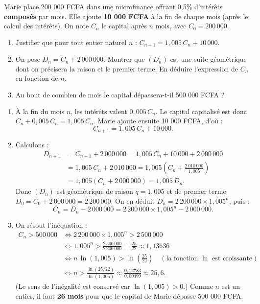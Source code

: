 \documentclass[11pt]{article}
\begin{document}
\begin{exercice}
Marie place 200 000 FCFA dans une microfinance offrant 0,5\% d'intérêts \textbf{composés} par mois. Elle ajoute \textbf{10 000 FCFA} à la fin de chaque mois (après le calcul des intérêts). On note $C_n$ le capital après $n$ mois, avec $C_0 = 200\,000$.
\begin{enumerate}
    \item Justifier que pour tout entier naturel $n$ : $C_{n+1} = 1,005\, C_n + 10\,000$.
    \item On pose $D_n = C_n + 2\,000\,000$. Montrer que $(D_n)$ est une suite géométrique dont on précisera la raison et le premier terme. En déduire l'expression de $C_n$ en fonction de $n$.
    \item Au bout de combien de mois le capital dépassera-t-il 500 000 FCFA ?
\end{enumerate}
\end{exercice}

\begin{corrige}[Exercice 1]
\begin{enumerate}
    \item À la fin du mois $n$, les intérêts valent $0,005\, C_n$. Le capital capitalisé est donc $C_n + 0,005\,C_n = 1,005\,C_n$. Marie ajoute ensuite 10 000 FCFA, d'où :
    \[
    C_{n+1} = 1,005\, C_n + 10\,000.
    \]
    \item Calculons :
    \begin{align*}
    D_{n+1} &= C_{n+1} + 2\,000\,000 = 1,005\, C_n + 10\,000 + 2\,000\,000 \\
    &= 1,005\, C_n + 2\,010\,000 = 1,005\left(C_n + \frac{2\,010\,000}{1,005}\right) \\
    &= 1,005\left(C_n + 2\,000\,000\right) = 1,005\, D_n.
    \end{align*}
    Donc $(D_n)$ est géométrique de raison $q = 1,005$ et de premier terme $D_0 = C_0 + 2\,000\,000 = 2\,200\,000$.
    On en déduit $D_n = 2\,200\,000 \times 1,005^n$, puis :
    \[
    C_n = D_n - 2\,000\,000 = 2\,200\,000 \times 1,005^n - 2\,000\,000.
    \]
    \item On résout l'inéquation :
    \begin{align*}
    C_n > 500\,000 &\iff 2\,200\,000 \times 1,005^n > 2\,500\,000 \\
    &\iff 1,005^n > \frac{2\,500\,000}{2\,200\,000} = \frac{25}{22} \approx 1,13636 \\
    &\iff n\, \ln(1,005) > \ln\left(\tfrac{25}{22}\right) \quad (\text{la fonction } \ln \text{ est croissante}) \\
    &\iff n > \frac{\ln(25/22)}{\ln(1,005)} \approx \frac{0,12783}{0,00499} \approx 25,6.
    \end{align*}
    (Le sens de l'inégalité est conservé car $\ln(1,005) > 0$.) Comme $n$ est un entier, il faut \textbf{26 mois} pour que le capital de Marie dépasse 500 000 FCFA.
\end{enumerate}
\end{corrige}
\end{document}
